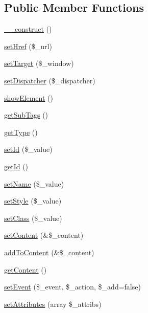 \subsection*{Public Member Functions}
\begin{DoxyCompactItemize}
\item 
\hyperlink{classContainerLinkPlugin_a8f6993ba02eb044075b704aee8e4e1d7}{\_\-\_\-construct} ()
\item 
\hyperlink{classContainerLinkPlugin_af7bce8f0ea792e52b813b9d3c688be41}{setHref} (\$\_\-url)
\item 
\hyperlink{classContainerLinkPlugin_a163b07c2649f475cb722aadd032ec1cf}{setTarget} (\$\_\-window)
\item 
\hyperlink{classContainerLinkPlugin_afa981880304670af9a2441d94850d8fc}{setDispatcher} (\$\_\-dispatcher)
\item 
\hyperlink{classContainerLinkPlugin_af1568be54815de36bb7f3909989f0309}{showElement} ()
\item 
\hyperlink{classContainerPlugin_a09e2c6dc8c9bfe4fd01a74b6764a0eb4}{getSubTags} ()
\item 
\hyperlink{classContainerPlugin_a7e808605f7c6ac4eb741db4a272e135d}{getType} ()
\item 
\hyperlink{classBaseElement_a0c1ce3d1684ecb78960cf7a97278494e}{setId} (\$\_\-value)
\item 
\hyperlink{classBaseElement_a4a7aa583ee21af392908d7fd42fde790}{getId} ()
\item 
\hyperlink{classBaseElement_a39bafb3609d10048920c20242c2a04c5}{setName} (\$\_\-value)
\item 
\hyperlink{classBaseElement_a6b2b9ff69f6e92db82f91d9c55cda697}{setStyle} (\$\_\-value)
\item 
\hyperlink{classBaseElement_af6597b30fa9798878f6290271043dfa2}{setClass} (\$\_\-value)
\item 
\hyperlink{classBaseElement_a164a9c6e4ee68afa0ad343942ba54d28}{setContent} (\&\$\_\-content)
\item 
\hyperlink{classBaseElement_abd48eef64ca4f419f26d66a0c0419908}{addToContent} (\&\$\_\-content)
\item 
\hyperlink{classBaseElement_af8c86b93bcdcfbc415bf96c622dc5516}{getContent} ()
\item 
\hyperlink{classBaseElement_ad5789f45f16aaa144716ee8558069c31}{setEvent} (\$\_\-event, \$\_\-action, \$\_\-add=false)
\item 
\hyperlink{classBaseElement_a7d8ddd64ceb3401a7cb84548656b3709}{setAttributes} (array \$\_\-attribs)

\end{DoxyCompactItemize}
